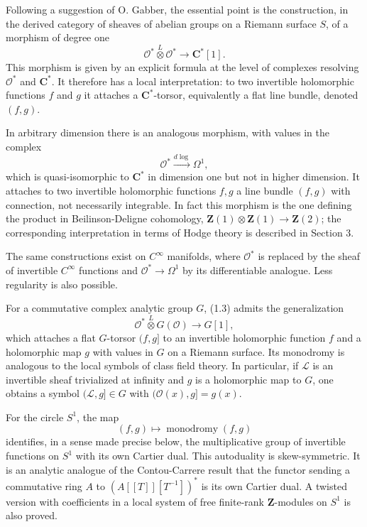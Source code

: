 \documentclass[11pt]{article}
\theoremstyle{remark}
\newcommand{\C}{\mathbf C}
\newcommand{\Z}{\mathbf Z}
\newcommand{\OO}{\mathcal O}
\newcommand{\LL}{\mathcal L}
\begin{document}
Following a suggestion of O. Gabber, the essential point is the construction, in the derived category of sheaves of abelian groups on a Riemann surface $S$, of a morphism of degree one
\begin{equation}\tag{1.3}
 \OO^*\overset L\otimes\OO^*\longrightarrow \C^*[1].
\end{equation}
This morphism is given by an explicit formula at the level of complexes resolving $\OO^*$ and $\C^*$. It therefore has a local interpretation: to two invertible holomorphic functions $f$ and $g$ it attaches a $\C^*$-torsor, equivalently a flat line bundle, denoted $(f,g)$.

In arbitrary dimension there is an analogous morphism, with values in the complex
\[
 \OO^*\xrightarrow{d\log}\Omega^1,
\]
which is quasi-isomorphic to $\C^*$ in dimension one but not in higher dimension. It attaches to two invertible holomorphic functions $f,g$ a line bundle $(f,g)$ with connection, not necessarily integrable. In fact this morphism is the one defining the product in Beilinson-Deligne cohomology, $\Z(1)\otimes\Z(1)\to\Z(2)$; the corresponding interpretation in terms of Hodge theory is described in Section 3.

The same constructions exist on $C^\infty$ manifolds, where $\OO^*$ is replaced by the sheaf of invertible $C^\infty$ functions and $\OO^*\to\Omega^1$ by its differentiable analogue. Less regularity is also possible.

For a commutative complex analytic group $G$, (1.3) admits the generalization
\begin{equation}\tag{1.4}
 \OO^*\overset L\otimes G(\OO)\longrightarrow G[1],
\end{equation}
which attaches a flat $G$-torsor $(f,g]$ to an invertible holomorphic function $f$ and a holomorphic map $g$ with values in $G$ on a Riemann surface. Its monodromy is analogous to the local symbols of class field theory. In particular, if $\LL$ is an invertible sheaf trivialized at infinity and $g$ is a holomorphic map to $G$, one obtains a symbol $(\LL,g]\in G$ with $(\OO(x),g]=g(x)$.

For the circle $S^1$, the map
\[
 (f,g)\longmapsto \operatorname{monodromy}(f,g)
\]
identifies, in a sense made precise below, the multiplicative group of invertible functions on $S^1$ with its own Cartier dual. This autoduality is skew-symmetric. It is an analytic analogue of the Contou-Carrere result that the functor sending a commutative ring $A$ to $(A[[T]][T^{-1}])^*$ is its own Cartier dual. A twisted version with coefficients in a local system of free finite-rank $\Z$-modules on $S^1$ is also proved.
\end{document}
